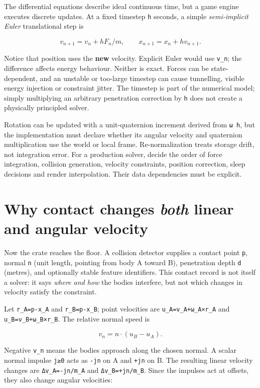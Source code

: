 The differential equations describe ideal continuous time, but a game engine executes discrete updates. At a fixed timestep \texttt{h} seconds, a simple \emph{semi-implicit Euler} translational step is

\[
v_{n+1}=v_n+h F_n/m,\qquad x_{n+1}=x_n+h v_{n+1}.
\]

Notice that position uses the \textbf{new} velocity. Explicit Euler would use \texttt{v\_n}; the difference affects energy behaviour. Neither is exact. Forces can be state-dependent, and an unstable or too-large timestep can cause tunnelling, visible energy injection or constraint jitter. The timestep is part of the numerical model; simply multiplying an arbitrary penetration correction by \texttt{h} does not create a physically principled solver.

Rotation can be updated with a unit-quaternion increment derived from \texttt{ω\ h}, but the implementation must declare whether its angular velocity and quaternion multiplication use the world or local frame. Re-normalization treats storage drift, not integration error. For a production solver, decide the order of force integration, collision generation, velocity constraints, position correction, sleep decisions and render interpolation. Their data dependencies must be explicit.

\section{\texorpdfstring{Why contact changes \emph{both} linear and angular velocity}{Why contact changes both linear and angular velocity}}\label{02-foundations-ii-ch039-why-contact-changes-both-linear-and-angular-velocity}

Now the crate reaches the floor. A collision detector supplies a contact point \texttt{p}, normal \texttt{n} (unit length, pointing from body A toward B), penetration depth \texttt{d} (metres), and optionally stable feature identifiers. This contact record is not itself a solver: it says \emph{where and how} the bodies interfere, but not which changes in velocity satisfy the constraint.

Let \texttt{r\_A=p-x\_A} and \texttt{r\_B=p-x\_B}; point velocities are \texttt{u\_A=v\_A+ω\_A×r\_A} and \texttt{u\_B=v\_B+ω\_B×r\_B}. The relative normal speed is

\[
v_n=n\cdot(u_B-u_A).
\]

Negative \texttt{v\_n} means the bodies approach along the chosen normal. A scalar normal impulse \texttt{j≥0} acts as \texttt{-jn} on A and \texttt{+jn} on B. The resulting linear velocity changes are \texttt{Δv\_A=-jn/m\_A} and \texttt{Δv\_B=+jn/m\_B}. Since the impulses act at offsets, they also change angular velocities:

